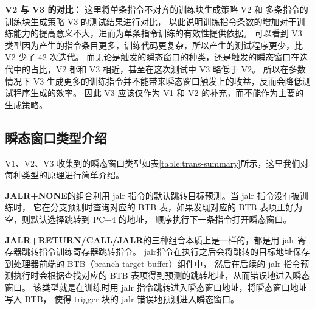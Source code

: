 \textbf{V2 与 V3 的对比：}
这里将单条指令不对齐的训练块生成策略 V2 和 多条指令的训练块生成策略 V3 的测试结果进行对比，
以此说明训练指令条数的增加对于训练能力的提高意义不大，进而为单条指令训练的有效性提供依据。
可以看到 V3 类型因为产生的指令条目更多，训练代码更复杂，所以产生的测试程序更少，比 V2 少了 42 次迭代。
而无论是触发的瞬态窗口的种类，还是触发的瞬态窗口在迭代中的占比，V2 都和 V3 相近，甚至在这次测试中 V3 略低于 V2。
所以在多数情况下 V3 生成更多的训练指令并不能带来瞬态窗口触发上的收益，反而会降低测试程序生成的效率。
因此 V3 应该仅作为 V1 和 V2 的补充，而不能作为主要的生成策略。\par

\subsection{瞬态窗口类型介绍}

V1、V2、V3 收集到的瞬态窗口类型如表\ref{table:trans-summary}所示，这里我们对每种类型的原理进行简单介绍。\par

\textbf{JALR+NONE}的组合利用 jalr 指令的默认跳转目标预测。当 jalr 指令没有被训练时，
它在分支预测时查询对应的 BTB 表，如果发现对应的 BTB 表项正好为空，则默认选择跳转到 PC+4 的地址，
顺序执行下一条指令打开瞬态窗口。\par

\textbf{JALR+RETURN/CALL/JALR}的三种组合本质上是一样的，都是用 jalr 寄存器跳转指令训练寄存器跳转指令。
jalr指令在执行之后会将跳转的目标地址保存到处理器前端的 BTB（branch target buffer）组件中，
然后在后续的 jalr 指令预测执行时会根据查找对应的 BTB 表项得到预测的跳转地址，从而错误地进入瞬态窗口。
该类型就是在训练时用 jalr 指令跳转进入瞬态窗口地址，将瞬态窗口地址写入 BTB，
使得 trigger 块的 jalr 错误地预测进入瞬态窗口。\par

